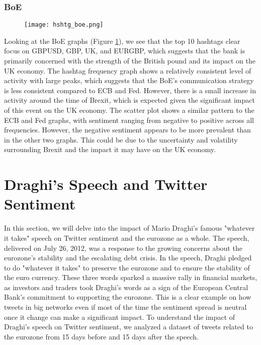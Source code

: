 \documentclass[fleqn,10pt]{SelfArx} %
\begin{document}
\subsubsection{BoE}
\begin{figure}[ht]\centering
	\texttt{[image: hshtg\_boe.png]}
	\caption{}
	\label{fig:boe_hshtg}
\end{figure}


Looking at the BoE graphs (Figure  \ref{fig:boe_hshtg}), we see that the top 10 hashtags clear focus on GBPUSD, GBP, UK, and EURGBP, which suggests that the bank is primarily concerned with the strength of the British pound and its impact on the UK economy. The hashtag frequency graph shows a relatively consistent level of activity with large peaks, which suggests that the BoE's communication strategy is less consistent compared to ECB and Fed. However, there is a small increase in activity around the time of Brexit, which is expected given the significant impact of this event on the UK economy. The scatter plot shows a similar pattern to the ECB and Fed graphs, with sentiment ranging from negative to positive across all frequencies. However, the negative sentiment appears to be more prevalent than in the other two graphs. This could be due to the uncertainty and volatility surrounding Brexit and the impact it may have on the UK economy.




\section{Draghi's Speech and Twitter Sentiment}

In this section, we will delve into the impact of Mario Draghi's famous "whatever it takes" speech on Twitter sentiment and the eurozone as a whole. The speech, delivered on July 26, 2012, was a response to the growing concerns about the eurozone's stability and the escalating debt crisis. In the speech, Draghi pledged to do "whatever it takes" to preserve the eurozone and to ensure the stability of the euro currency. These three words sparked a massive rally in financial markets, as investors and traders took Draghi's words as a sign of the European Central Bank's commitment to supporting the eurozone. This is a clear example on how tweets in big networks even if most of the time the sentiment spread is neutral once it change can make a significant impact. To understand the impact of Draghi's speech on Twitter sentiment, we analyzed a dataset of tweets related to the eurozone from 15 days before and 15 days after the speech. 
\end{document}

